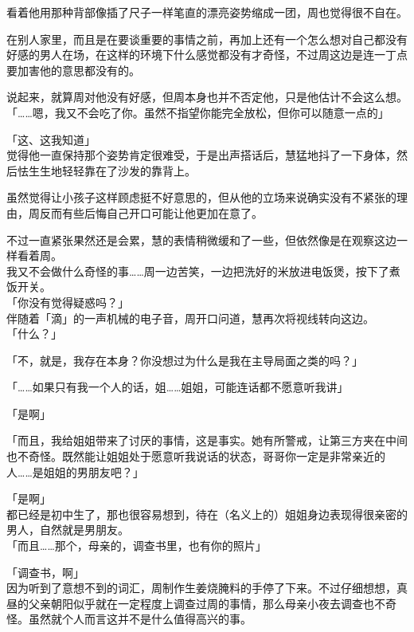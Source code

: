 看着他用那种背部像插了尺子一样笔直的漂亮姿势缩成一团，周也觉得很不自在。

在别人家里，而且是在要谈重要的事情之前，再加上还有一个怎么想对自己都没有好感的男人在场，在这样的环境下什么感觉都没有才奇怪，不过周这边是连一丁点要加害他的意思都没有的。

说起来，就算周对他没有好感，但周本身也并不否定他，只是他估计不会这么想。\\

「……嗯，我又不会吃了你。虽然不指望你能完全放松，但你可以随意一点的」

「这、这我知道」\\

觉得他一直保持那个姿势肯定很难受，于是出声搭话后，慧猛地抖了一下身体，然后怯生生地轻轻靠在了沙发的靠背上。

虽然觉得让小孩子这样顾虑挺不好意思的，但从他的立场来说确实没有不紧张的理由，周反而有些后悔自己开口可能让他更加在意了。

不过一直紧张果然还是会累，慧的表情稍微缓和了一些，但依然像是在观察这边一样看着周。\\

我又不会做什么奇怪的事……周一边苦笑，一边把洗好的米放进电饭煲，按下了煮饭开关。\\

「你没有觉得疑惑吗？」\\

伴随着「滴」的一声机械的电子音，周开口问道，慧再次将视线转向这边。\\

「什么？」

「不，就是，我存在本身？你没想过为什么是我在主导局面之类的吗？」

「……如果只有我一个人的话，姐……姐姐，可能连话都不愿意听我讲」

「是啊」

「而且，我给姐姐带来了讨厌的事情，这是事实。她有所警戒，让第三方夹在中间也不奇怪。既然能让姐姐处于愿意听我说话的状态，哥哥你一定是非常亲近的人……是姐姐的男朋友吧？」

「是啊」\\

都已经是初中生了，那也很容易想到，待在（名义上的）姐姐身边表现得很亲密的男人，自然就是男朋友。\\

「而且……那个，母亲的，调查书里，也有你的照片」

「调查书，啊」\\

因为听到了意想不到的词汇，周制作生姜烧腌料的手停了下来。不过仔细想想，真昼的父亲朝阳似乎就在一定程度上调查过周的事情，那么母亲小夜去调查也不奇怪。虽然就个人而言这并不是什么值得高兴的事。\\


